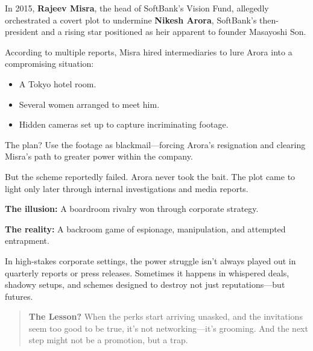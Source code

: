\begin{tcolorbox}[colback=blue!5!white, colframe=blue!50!black, breakable,
  title={Historical Sidebar: The SoftBank Vision Fund Blackmail Plot (2015)}]

In 2015, \textbf{Rajeev Misra}, the head of SoftBank’s Vision Fund, allegedly orchestrated a covert plot to undermine \textbf{Nikesh Arora}, SoftBank’s then-president and a rising star positioned as heir apparent to founder Masayoshi Son.

\medskip

According to multiple reports, Misra hired intermediaries to lure Arora into a compromising situation:  

\medskip

\begin{itemize}
  \item A Tokyo hotel room.
  \item Several women arranged to meet him.
  \item Hidden cameras set up to capture incriminating footage.
\end{itemize}

The plan?  Use the footage as blackmail—forcing Arora’s resignation and clearing Misra’s path to greater power within the company.

\medskip

But the scheme reportedly failed. Arora never took the bait. The plot came to light only later through internal investigations and media reports.

\medskip

\textbf{The illusion:} A boardroom rivalry won through corporate strategy.

\medskip

\textbf{The reality:} A backroom game of espionage, manipulation, and attempted entrapment.

\medskip

In high-stakes corporate settings, the power struggle isn’t always played out in quarterly reports or press releases. Sometimes it happens in whispered deals, shadowy setups, and schemes designed to destroy not just reputations—but futures.

\medskip

\begin{quote}
\textbf{The Lesson?} When the perks start arriving unasked, and the invitations seem too good to be true, it’s not networking—it’s grooming. And the next step might not be a promotion, but a trap.
\end{quote}

\end{tcolorbox}


